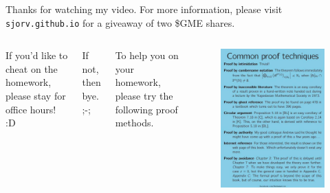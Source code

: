\documentclass{beamer}
\begin{document}
\begin{frame}{Thanks for watching my video. For more information, please visit \texttt{sjorv.github.io} for a giveaway of two \$GME shares.}

\begin{columns}
If you'd like to cheat on the homework, please stay for office hours! :D
\vspace{4mm}

If not, then bye. ;-; 

To help you on your homework, please try the following proof methods.
\begin{figure}[h]
\centering
\includegraphics[scale=0.21]{img/proof_techniques.png}
\end{figure}
\end{columns}


\end{frame}
\end{document}
